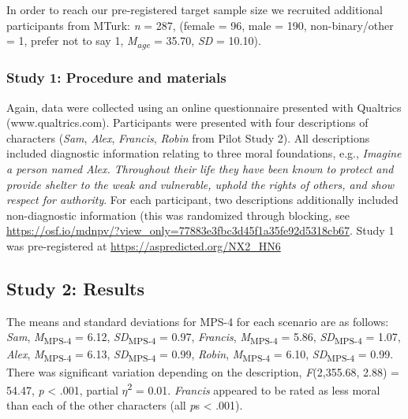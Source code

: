 \documentclass[
  english,
  man,floatsintext]{apa7}
\begin{document}
In order to reach our pre-registered target sample size we recruited additional participants from MTurk: \emph{n} = 287, (female = 96, male = 190, non-binary/other = 1, prefer not to say 1, \emph{M\textsubscript{age}} = 35.70, \emph{SD} = 10.10).

\hypertarget{study-1-procedure-and-materials-1}{%
\subsubsection{Study 1: Procedure and materials}\label{study-1-procedure-and-materials-1}}

Again, data were collected using an online questionnaire presented with Qualtrics (www.qualtrics.com). Participants were presented with four descriptions of characters (\emph{Sam}, \emph{Alex}, \emph{Francis}, \emph{Robin} from Pilot Study 2). All descriptions included diagnostic information relating to three moral foundations, e.g., \emph{Imagine a person named Alex. Throughout their life they have been known to protect and provide shelter to the weak and vulnerable, uphold the rights of others, and show respect for authority}. For each participant, two descriptions additionally included non-diagnostic information (this was randomized through blocking, see \color{blue}\url{https://osf.io/mdnpv/?view_only=77883e3fbc3d45f1a35fe92d5318cb67}\color{black}. Study 1 was pre-registered at \color{blue}\url{https://aspredicted.org/NX2_HN6}\color{black}

\hypertarget{study-2-results}{%
\subsection{Study 2: Results}\label{study-2-results}}

The means and standard deviations for MPS-4 for each scenario are as follows:
\emph{Sam},
\emph{M}\textsubscript{MPS-4} = 6.12, \emph{SD}\textsubscript{MPS-4} = 0.97,
\emph{Francis},
\emph{M}\textsubscript{MPS-4} = 5.86, \emph{SD}\textsubscript{MPS-4} = 1.07,
\emph{Alex},
\emph{M}\textsubscript{MPS-4} = 6.13, \emph{SD}\textsubscript{MPS-4} = 0.99,
\emph{Robin},
\emph{M}\textsubscript{MPS-4} = 6.10, \emph{SD}\textsubscript{MPS-4} = 0.99. There was significant variation depending on the description, \emph{F}(2,355.68, 2.88) = 54.47, \emph{p} \textless{} .001, partial \(\eta\)\textsuperscript{2} = 0.01. \emph{Francis} appeared to be rated as less moral than each of the other characters (all \emph{p}s \textless{} .001).
\end{document}
